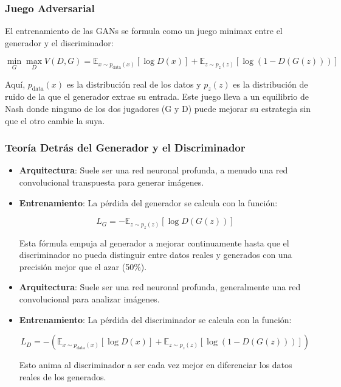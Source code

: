 \subsubsection{Juego Adversarial}

El entrenamiento de las GANs se formula como un juego minimax entre el generador y el discriminador:

\begin{equation}
\min_G \max_D V(D, G) = \mathbb{E}_{x \sim p_{\text{data}}(x)} [\log D(x)] + \mathbb{E}_{z \sim p_z(z)} [\log(1 - D(G(z)))]
\end{equation}

Aquí, \( p_{\text{data}}(x) \) es la distribución real de los datos y \( p_z(z) \) es la distribución de ruido de la que el generador extrae su entrada. Este juego lleva a un equilibrio de Nash donde ninguno de los dos jugadores (G y D) puede mejorar su estrategia sin que el otro cambie la suya.

\subsubsection{Teoría Detrás del Generador y el Discriminador}

\begin{itemize}
    \item \textbf{Arquitectura}: Suele ser una red neuronal profunda, a menudo una red convolucional transpuesta para generar imágenes.
    \item \textbf{Entrenamiento}: La pérdida del generador se calcula con la función:

    \begin{equation}
    L_G = -\mathbb{E}_{z \sim p_z(z)} [\log D(G(z))]
    \end{equation}

    Esta fórmula empuja al generador a mejorar continuamente hasta que el discriminador no pueda distinguir entre datos reales y generados con una precisión mejor que el azar (50\%).
\end{itemize}

\begin{itemize}
    \item \textbf{Arquitectura}: Suele ser una red neuronal profunda, generalmente una red convolucional para analizar imágenes.
    \item \textbf{Entrenamiento}: La pérdida del discriminador se calcula con la función:

    \begin{equation}
    L_D = -\left( \mathbb{E}_{x \sim p_{\text{data}}(x)} [\log D(x)] + \mathbb{E}_{z \sim p_z(z)} [\log(1 - D(G(z)))] \right)
    \end{equation}

    Esto anima al discriminador a ser cada vez mejor en diferenciar los datos reales de los generados.
\end{itemize}

